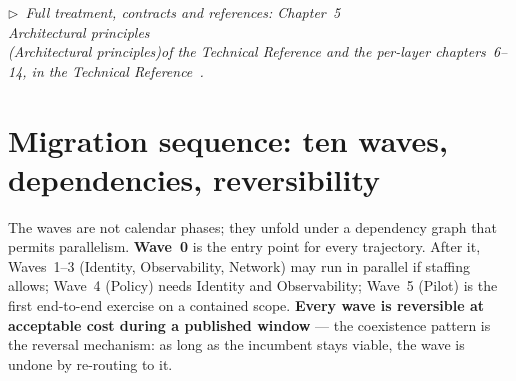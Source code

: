 \documentclass[11pt,a4paper]{article}
\newcommand{\keyword}[1]{\textbf{#1}}
\newcommand{\trchap}[2]{%
  Chapter~#1%
  \ifx\\#2\\\else\space(\emph{#2})\fi\space of the Technical Reference}
\newcommand{\mainref}[1]{%
  \par\vspace{1pt}
  {\footnotesize\color{gray}\itshape
  $\triangleright$~Full treatment, contracts and references: #1,
  in the Technical Reference~\cite{ng-tech-ref-2026}.}\par\vspace{2pt}}
\begin{document}
\mainref{\trchap{5}{Architectural principles} and the per-layer
chapters~6--14}

\section{Migration sequence: ten waves, dependencies, reversibility}

The waves are not calendar phases; they unfold under a dependency graph that
permits parallelism. \keyword{Wave~0} is the entry point for every
trajectory. After it, Waves~1--3 (Identity, Observability, Network) may run
in parallel if staffing allows; Wave~4 (Policy) needs Identity and
Observability; Wave~5 (Pilot) is the first end-to-end exercise on a contained
scope. \keyword{Every wave is reversible at acceptable cost during a published
window} --- the coexistence pattern is the reversal mechanism: as long as the
incumbent stays viable, the wave is undone by re-routing to it.
\end{document}
